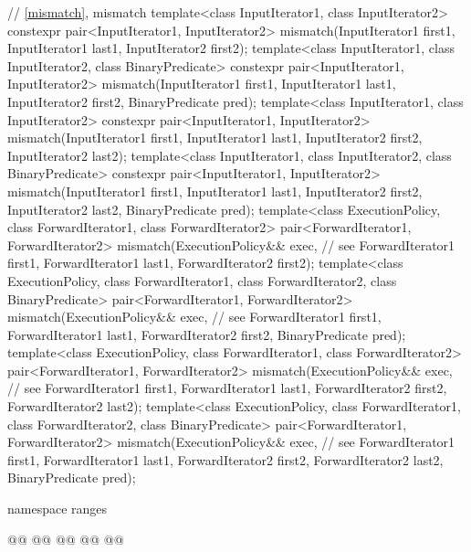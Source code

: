 \begin{codeblock}
  // \ref{mismatch}, mismatch
  template<class InputIterator1, class InputIterator2>
    constexpr pair<InputIterator1, InputIterator2>
      mismatch(InputIterator1 first1, InputIterator1 last1,
               InputIterator2 first2);
  template<class InputIterator1, class InputIterator2, class BinaryPredicate>
    constexpr pair<InputIterator1, InputIterator2>
      mismatch(InputIterator1 first1, InputIterator1 last1,
               InputIterator2 first2, BinaryPredicate pred);
  template<class InputIterator1, class InputIterator2>
    constexpr pair<InputIterator1, InputIterator2>
      mismatch(InputIterator1 first1, InputIterator1 last1,
               InputIterator2 first2, InputIterator2 last2);
  template<class InputIterator1, class InputIterator2, class BinaryPredicate>
    constexpr pair<InputIterator1, InputIterator2>
      mismatch(InputIterator1 first1, InputIterator1 last1,
               InputIterator2 first2, InputIterator2 last2,
               BinaryPredicate pred);
  template<class ExecutionPolicy, class ForwardIterator1, class ForwardIterator2>
    pair<ForwardIterator1, ForwardIterator2>
      mismatch(ExecutionPolicy&& exec, // see 
               ForwardIterator1 first1, ForwardIterator1 last1,
               ForwardIterator2 first2);
  template<class ExecutionPolicy, class ForwardIterator1, class ForwardIterator2,
           class BinaryPredicate>
    pair<ForwardIterator1, ForwardIterator2>
      mismatch(ExecutionPolicy&& exec, // see 
               ForwardIterator1 first1, ForwardIterator1 last1,
               ForwardIterator2 first2, BinaryPredicate pred);
  template<class ExecutionPolicy, class ForwardIterator1, class ForwardIterator2>
    pair<ForwardIterator1, ForwardIterator2>
      mismatch(ExecutionPolicy&& exec, // see 
               ForwardIterator1 first1, ForwardIterator1 last1,
               ForwardIterator2 first2, ForwardIterator2 last2);
  template<class ExecutionPolicy, class ForwardIterator1, class ForwardIterator2,
           class BinaryPredicate>
    pair<ForwardIterator1, ForwardIterator2>
      mismatch(ExecutionPolicy&& exec, // see 
               ForwardIterator1 first1, ForwardIterator1 last1,
               ForwardIterator2 first2, ForwardIterator2 last2,
               BinaryPredicate pred);
\end{codeblock}\begin{addedblock}\begin{codeblock}
  namespace ranges {
    @@
    @@
      @@
      @@
    @\newtxt{\};}@

}
\end{codeblock}
\end{addedblock}
